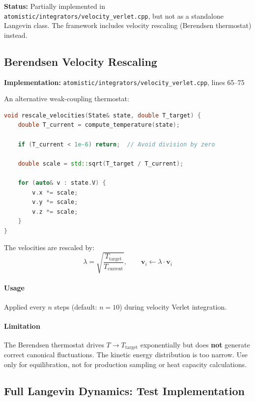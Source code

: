\documentclass[11pt]{article}
\begin{document}
\textbf{Status:} Partially implemented in \texttt{atomistic/integrators/velocity\_verlet.cpp}, but not as a standalone Langevin class. The framework includes velocity rescaling (Berendsen thermostat) instead.

\subsection{Berendsen Velocity Rescaling}

\textbf{Implementation:} \texttt{atomistic/integrators/velocity\_verlet.cpp}, lines 65--75

An alternative weak-coupling thermostat:

\begin{lstlisting}[language=C++]
void rescale_velocities(State& state, double T_target) {
    double T_current = compute_temperature(state);
    
    if (T_current < 1e-6) return;  // Avoid division by zero
    
    double scale = std::sqrt(T_target / T_current);
    
    for (auto& v : state.V) {
        v.x *= scale;
        v.y *= scale;
        v.z *= scale;
    }
}
\end{lstlisting}

The velocities are rescaled by:
\begin{equation}
\lambda = \sqrt{\frac{T_{\text{target}}}{T_{\text{current}}}}, \qquad \mathbf{v}_i \gets \lambda \cdot \mathbf{v}_i
\end{equation}

\paragraph{Usage} Applied every $n$ steps (default: $n = 10$) during velocity Verlet integration.

\paragraph{Limitation} The Berendsen thermostat drives $T \to T_{\text{target}}$ exponentially but does \textbf{not} generate correct canonical fluctuations. The kinetic energy distribution is too narrow. Use only for equilibration, not for production sampling or heat capacity calculations.

\subsection{Full Langevin Dynamics: Test Implementation}
\end{document}
